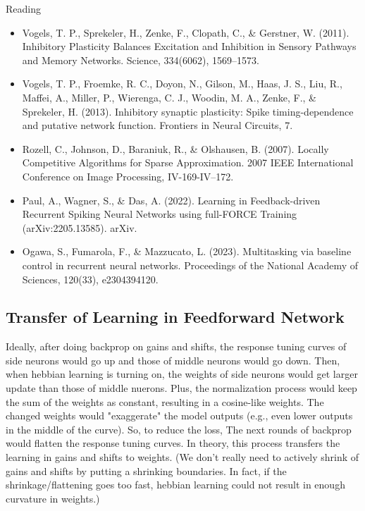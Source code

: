 \documentclass[12pt, a4paper]{article}
\begin{document}
\noindent
Reading

\begin{itemize}
    \item Vogels, T. P., Sprekeler, H., Zenke, F., Clopath, C., \& Gerstner, W. (2011). Inhibitory Plasticity Balances Excitation and Inhibition in Sensory Pathways and Memory Networks. Science, 334(6062), 1569–1573.
    \item Vogels, T. P., Froemke, R. C., Doyon, N., Gilson, M., Haas, J. S., Liu, R., Maffei, A., Miller, P., Wierenga, C. J., Woodin, M. A., Zenke, F., \& Sprekeler, H. (2013). Inhibitory synaptic plasticity: Spike timing-dependence and putative network function. Frontiers in Neural Circuits, 7.
    \item Rozell, C., Johnson, D., Baraniuk, R., \& Olshausen, B. (2007). Locally Competitive Algorithms for Sparse Approximation. 2007 IEEE International Conference on Image Processing, IV-169-IV–172.
    \item Paul, A., Wagner, S., \& Das, A. (2022). Learning in Feedback-driven Recurrent Spiking Neural Networks using full-FORCE Training (arXiv:2205.13585). arXiv.
    \item Ogawa, S., Fumarola, F., \& Mazzucato, L. (2023). Multitasking via baseline control in recurrent neural networks. Proceedings of the National Academy of Sciences, 120(33), e2304394120.
\end{itemize}

\newpage

\subsection*{Transfer of Learning in Feedforward Network}


Ideally, after doing backprop on gains and shifts, the response tuning curves of side neurons would go up and those of middle neurons would go down. Then, when hebbian learning is turning on, the weights of side neurons would get larger update than those of middle nuerons. Plus, the normalization process would keep the sum of the weights as constant, resulting in a cosine-like weights. The changed weights would "exaggerate" the model outputs (e.g., even lower outputs in the middle of the curve). So, to reduce the loss, The next rounds of backprop would flatten the response tuning curves. In theory, this process transfers the learning in gains and shifts to weights. (We don't really need to actively shrink of gains and shifts by putting a shrinking boundaries. In fact, if the shrinkage/flattening goes too fast, hebbian learning could not result in enough curvature in weights.)
\end{document}
